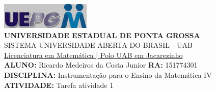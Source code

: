 \documentclass[a4paper, 12pt]{article}
\begin{document}
\includegraphics{logo}\\
\textbf{UNIVERSIDADE ESTADUAL DE PONTA GROSSA} \\
SISTEMA UNIVERSIDADE ABERTA DO BRASIL - UAB \\
\underline{Licenciatura em Matemática | Polo UAB em Jacarezinho} \\
\textbf{ALUNO:} Ricardo Medeiros da Costa Junior   \textbf{RA:} 151774301 \\
\textbf{DISCIPLINA:} Instrumentação para o Ensino da Matemática IV \\
\textbf{ATIVIDADE:} Tarefa atividade 1 \\
\end{document}
